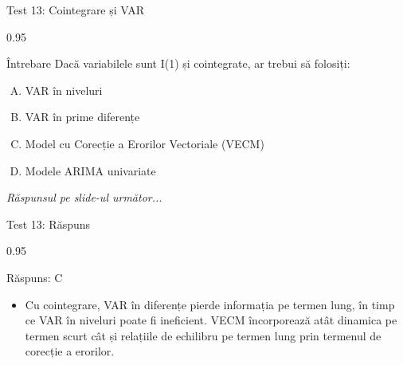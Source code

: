 \documentclass[9pt, aspectratio=169, t]{beamer}
\begin{document}
\begin{frame}{Test 13: Cointegrare și VAR}
    \begin{cminipage}{0.95\textwidth}
    \begin{alertblock}{Întrebare}
        Dacă variabilele sunt I(1) și cointegrate, ar trebui să folosiți:
    \end{alertblock}

    \vspace{0.3cm}

    \begin{enumerate}[A)]\setlength{\itemsep}{0pt}
        \item VAR în niveluri
        \item VAR în prime diferențe
        \item Model cu Corecție a Erorilor Vectoriale (VECM)
        \item Modele ARIMA univariate
    \end{enumerate}

    \vspace{0.5cm}
    \begin{flushright}\textit{Răspunsul pe slide-ul următor...}\end{flushright}
    \end{cminipage}
\end{frame}

\begin{frame}{Test 13: Răspuns}
    \begin{cminipage}{0.95\textwidth}
    \begin{exampleblock}{Răspuns: C}
        \begin{itemize}\setlength{\itemsep}{0pt}
            \item Cu cointegrare, VAR în diferențe pierde informația pe termen lung, în timp ce VAR în niveluri poate fi ineficient. VECM încorporează atât dinamica pe termen scurt cât și relațiile de echilibru pe termen lung prin termenul de corecție a erorilor.
        \end{itemize}
    \end{exampleblock}
    \end{cminipage}
\end{frame}
\end{document}
